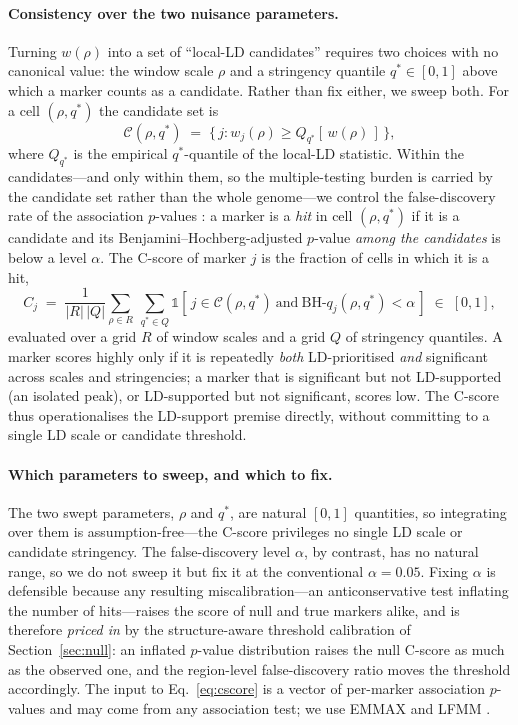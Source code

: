 \documentclass[11pt]{article}
\begin{document}
\paragraph{Consistency over the two nuisance parameters.}
Turning $w(\rho)$ into a set of ``local-LD candidates'' requires two choices with
no canonical value: the window scale $\rho$ and a stringency quantile
$q^* \in [0,1]$ above which a marker counts as a candidate. Rather than fix
either, we sweep both. For a cell $(\rho, q^*)$ the candidate set is
\begin{equation}
  \mathcal{C}(\rho, q^*) \;=\; \bigl\{\, j : w_j(\rho) \ge Q_{q^*}\!\left[\,w(\rho)\,\right] \,\bigr\},
\end{equation}
where $Q_{q^*}$ is the empirical $q^*$-quantile of the local-LD statistic. Within
the candidates---and only within them, so the multiple-testing burden is carried
by the candidate set rather than the whole genome---we control the false-discovery
rate of the association $p$-values \citep{benjamini1995controlling}: a marker is a
\emph{hit} in cell $(\rho, q^*)$ if it is a candidate and its
Benjamini--Hochberg-adjusted $p$-value \emph{among the candidates} is below a
level $\alpha$. The C-score of marker $j$ is the fraction of cells in which it is
a hit,
\begin{equation}
  C_j \;=\; \frac{1}{|R|\,|Q|} \sum_{\rho \in R}\ \sum_{q^* \in Q}
        \mathbb{1}\!\left[\, j \in \mathcal{C}(\rho, q^*)\ \text{and}\
        \mathrm{BH}\text{-}q_j(\rho, q^*) < \alpha \,\right] \;\in\; [0,1],
  \label{eq:cscore}
\end{equation}
evaluated over a grid $R$ of window scales and a grid $Q$ of stringency
quantiles. A marker scores highly only if it is repeatedly \emph{both}
LD-prioritised \emph{and} significant across scales and stringencies; a marker
that is significant but not LD-supported (an isolated peak), or LD-supported but
not significant, scores low. The C-score thus operationalises the LD-support
premise directly, without committing to a single LD scale or candidate threshold.

\paragraph{Which parameters to sweep, and which to fix.}
The two swept parameters, $\rho$ and $q^*$, are natural $[0,1]$ quantities, so
integrating over them is assumption-free---the C-score privileges no single LD
scale or candidate stringency. The false-discovery level $\alpha$, by contrast,
has no natural range, so we do not sweep it but fix it at the conventional
$\alpha = 0.05$. Fixing $\alpha$ is defensible because any resulting
miscalibration---an anticonservative test inflating the number of hits---raises
the score of null and true markers alike, and is therefore \emph{priced in} by
the structure-aware threshold calibration of Section~\ref{sec:null}: an inflated
$p$-value distribution raises the null C-score as much as the observed one, and
the region-level false-discovery ratio moves the threshold accordingly. The input
to Eq.~\ref{eq:cscore} is a vector of per-marker association $p$-values and may
come from any association test; we use EMMAX \citep{kang2010variance} and LFMM
\citep{caye2019lfmm}.
\end{document}
